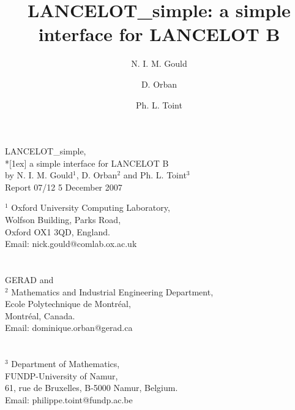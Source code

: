 \documentclass{article}
\title{{\sf LANCELOT\_simple}: a simple interface for {\sf LANCELOT B}}
\author{N. I. M. Gould \and D. Orban \and Ph. L. Toint}
\date{\documentdate}
\newcommand{\documentdate}{5 December 2007}
\begin{document}
\begin{titlepage}

\vspace*{7.5cm}
\begin{center}
\begin{minipage}{11.cm}
    \begin{center}
      {\sc
      {\large {\sf LANCELOT\_simple}}, \\*[1ex]
       a simple interface for {\sf LANCELOT B}
      }\\
      \vspace*{0.25 cm}
      by N. I. M. Gould${}^1$, D. Orban${}^2$ and Ph. L. Toint${}^3$\\
      \vspace*{0.15 cm}
      Report 07/12 \hspace*{2 cm} \documentdate
    \end{center}
\end{minipage}
\end{center}

\vspace{3 cm}

\begin{center}
${}^1$ Oxford University Computing Laboratory, \\
Wolfson Building, Parks Road, \\
Oxford OX1 3QD, England. \\
Email: nick.gould@comlab.ox.ac.uk\\
\mbox{}\\
\mbox{}\\
GERAD and\\
${}^2$ Mathematics and Industrial Engineering Department,\\
Ecole Polytechnique de Montr\'{e}al,\\
Montr\'{e}al, Canada.\\
Email: dominique.orban@gerad.ca\\
\mbox{}\\
\mbox{}\\
${}^3$ Department of Mathematics, \\
FUNDP-University of Namur,\\
61, rue de Bruxelles, B-5000 Namur, Belgium.\\
Email: philippe.toint@fundp.ac.be
\end{center}
\end{titlepage}

\maketitle
\end{document}
